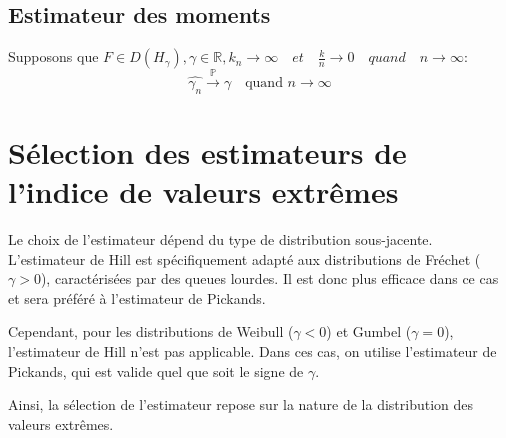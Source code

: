 \documentclass{article}
\begin{document}
\subsection{Estimateur des moments}
Supposons que \(F \in D(H_{\gamma}), \gamma \in \mathbb{R}, k_n \to \infty \quad et \quad \frac{k}{n} \to 0 \quad quand \quad n \to \infty\):
\[
\hat{\gamma_n} \xrightarrow{\mathbb{P}} \gamma \quad \text{quand } n \to \infty
\]


\section{Sélection des estimateurs de l'indice de valeurs extrêmes}

Le choix de l’estimateur dépend du type de distribution sous-jacente. L’estimateur de Hill est spécifiquement adapté aux distributions de Fréchet (\(\gamma > 0\)), caractérisées par des queues lourdes. Il est donc plus efficace dans ce cas et sera préféré à l’estimateur de Pickands.  

Cependant, pour les distributions de Weibull (\(\gamma < 0\)) et Gumbel (\(\gamma = 0\)), l’estimateur de Hill n’est pas applicable. Dans ces cas, on utilise l’estimateur de Pickands, qui est valide quel que soit le signe de \( \gamma \).  

Ainsi, la sélection de l’estimateur repose sur la nature de la distribution des valeurs extrêmes.  
\end{document}
